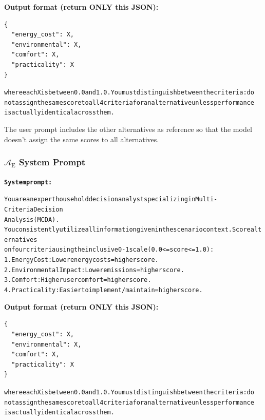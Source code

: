 \documentclass[11pt]{article}
\begin{document}
\medskip
\noindent\textbf{Output format (return ONLY this JSON):}
\begin{lstlisting}[style=jsonstyle]
{
  "energy_cost": X,
  "environmental": X,
  "comfort": X,
  "practicality": X
}
\end{lstlisting}
\begin{minipage}{\columnwidth}
\begin{alltt}
\footnotesize
where each X is between 0.0 and 1.0. You must distinguish between the criteria: do
  not assign the same score to all 4 criteria for an alternative unless performance
  is actually identical across them.
\end{alltt}
\end{minipage}

\medskip
\noindent The user prompt includes the other alternatives as reference so that the model doesn't assign the same scores to all alternatives.

\subsubsection{\texorpdfstring{$\mathcal{A}_{\text{E}}$}{A\_E} System Prompt}

\begin{minipage}{\columnwidth}
\begin{alltt}
\footnotesize
\textbf{System prompt:}

You are an expert household decision analyst specializing in Multi-Criteria Decision
  Analysis (MCDA).
You consistently utilize all information given in the scenario context. Score alternatives
  on four criteria using the inclusive 0-1 scale (0.0 <= score <= 1.0):
1. Energy Cost: Lower energy costs = higher score.
2. Environmental Impact: Lower emissions = higher score.
3. Comfort: Higher user comfort = higher score.
4. Practicality: Easier to implement/maintain = higher score.
\end{alltt}
\end{minipage}

\medskip
\noindent\textbf{Output format (return ONLY this JSON):}
\begin{lstlisting}[style=jsonstyle]
{
  "energy_cost": X,
  "environmental": X,
  "comfort": X,
  "practicality": X
}
\end{lstlisting}
\begin{minipage}{\columnwidth}
\begin{alltt}
\footnotesize
where each X is between 0.0 and 1.0. You must distinguish between the criteria: do
  not assign the same score to all 4 criteria for an alternative unless performance
  is actually identical across them.
\end{alltt}
\end{minipage}
\end{document}
